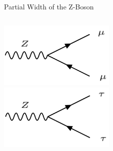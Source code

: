\begin{frame}{Partial Width of the Z-Boson}
\begin{columns}
\begin{column}{0.5\textwidth}
                \includegraphics[width = 0.42\textwidth]{content/images/Zdecay_mumu.png} \\
                \includegraphics[width = 0.42\textwidth]{content/images/Zdecay_tautau.png}
            \end{column}
        \end{columns}
         
         
    \end{frame}
